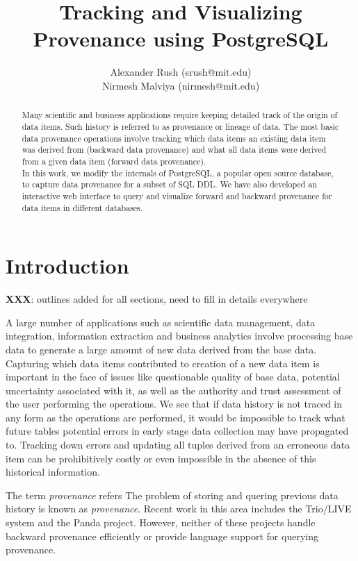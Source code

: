 \documentclass[11pt]{article}
\title{Tracking and Visualizing Provenance using PostgreSQL}
\author{Alexander Rush (srush@mit.edu)\\ Nirmesh Malviya (nirmesh@mit.edu)}
\begin{document}
\maketitle

\begin{abstract}
Many scientific and business applications require keeping detailed track of the origin of data items. Such history is referred to as provenance or lineage of data. The most basic data provenance operations involve tracking which data items an existing data item was derived from (backward data provenance) and what all data items were derived from a given data item (forward data provenance). \\

In this work, we modify the internals of PostgreSQL, a popular open source database, to capture data provenance for a subset of SQL DDL. We have also developed an interactive web interface to query and visualize forward and backward provenance for data items in different databases.
\end{abstract}

\section{Introduction}

\textbf{XXX}: outlines added for all sections, need to fill in details everywhere

A large number of applications such as scientific data management, data integration, information extraction and business analytics involve processing base data to generate a large amount of new data derived from the base data. Capturing which data items contributed to creation of a new data item is important in the face of issues like questionable quality of base data, potential uncertainty associated with it, as well as the authority and trust assessment of the user performing the operations. We see that if data history is not traced in any form as the operations are performed, it would be impossible to track what future tables potential errors in early stage data collection may have propagated to. Tracking down errors and updating all tuples derived from an erroneous data item can be prohibitively costly or even impossible in the absence of this historical information.

The term \textit{provenance} refers 
The problem of storing and quering previous data history is known as \emph{provenance}. Recent work in this area includes the Trio/LIVE system and the Panda project. However, neither of these projects handle backward provenance efficiently or provide language support for querying provenance.
\end{document}
